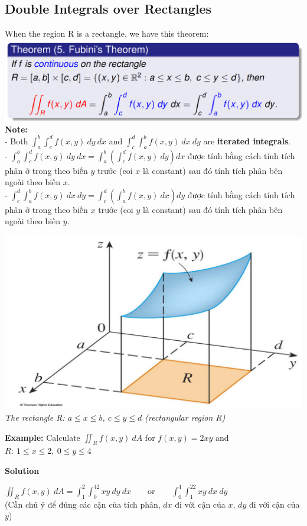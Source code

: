 \documentclass{article}
\begin{document}
\subsection{Double Integrals over Rectangles}
When the region R is a rectangle, we have this theorem:\\
\includegraphics[width=1\linewidth]{fubini.png}\\
\textbf{Note:}\\
- Both $\displaystyle\int_a^b\int_c^df(x,y)\ dy\ dx$ and $\displaystyle\int_c^d\int_a^bf(x,y)\ dx\ dy$ are\textbf{ iterated integrals}.\\
- $\displaystyle\int_a^b\int_c^df(x,y)\ dy\ dx=\displaystyle\int_a^b\left(\int_c^df(x,y)\ dy\right)dx$ được tính bằng cách tính tích phân ở trong theo biến $y$ trước (coi $x$ là constant) sau đó tính tích phân bên ngoài theo biến $x$.\\
- $\displaystyle\int_c^d\int_a^bf(x,y)\ dx\ dy=\displaystyle\int_c^d\left(\int_a^bf(x,y)\ dx\right)dy$ được tính bằng cách tính tích phân ở trong theo biến $x$ trước (coi $y$ là constant) sau đó tính tích phân bên ngoài theo biến $y$.
\begin{center}
    \includegraphics[width=0.5\linewidth]{rec.png}\\
    \textit{The rectangle R: $a\le x \le b$, $c\le y\le d$ (rectangular region R)}
\end{center}
\textbf{Example:} Calculate $\displaystyle\iint_Rf(x,y)\ dA$ for $f(x,y)=2xy$ and $R:\ 1\le x\le 2,\ 0\le y \le 4$
\begin{center}
    \textbf{Solution}
\end{center}
$\displaystyle\iint_Rf(x,y)\ dA=\int_1^2\int_0^42xy\ dy\ dx$\ \ \ \   or\ \ \ \ $\displaystyle\int_0^4\int_1^22xy\ dx\ dy$\\ (Cần chú ý để đúng các cận của tích phân, $dx$ đi với cận của $x$, $dy$ đi với cận của $y$)\\
\end{document}

